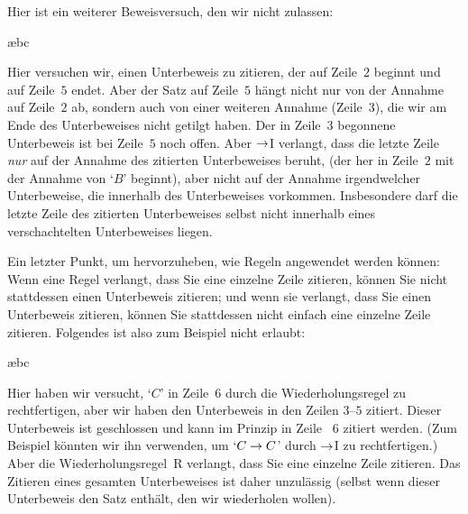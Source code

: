 Hier ist ein weiterer Beweisversuch, den wir nicht zulassen:
\begin{fitchproof}
\open
	\open
	\ae{bc}
	\close
\close
{}
 
\end{fitchproof}
Hier versuchen wir, einen Unterbeweis zu zitieren, der auf Zeile~$2$ beginnt und auf Zeile~$5$ endet. Aber der Satz auf Zeile~$5$ hängt nicht nur von der Annahme auf Zeile~$2$ ab, sondern auch von einer weiteren Annahme (Zeile~$3$), die wir am Ende des Unterbeweises nicht getilgt haben. Der in Zeile~$3$ begonnene Unterbeweis ist bei Zeile~$5$ noch offen. Aber $\rightarrow$I verlangt, dass die letzte Zeile \emph{nur} auf der Annahme des zitierten Unterbeweises beruht, (der her in Zeile~$2$ mit der Annahme von `$B$' beginnt), aber nicht auf der Annahme irgendwelcher Unterbeweise, die innerhalb des Unterbeweises vorkommen. Insbesondere darf die letzte Zeile des zitierten Unterbeweises selbst nicht innerhalb eines verschachtelten Unterbeweises liegen.


Ein letzter Punkt, um hervorzuheben, wie Regeln angewendet werden können: Wenn eine Regel verlangt, dass Sie eine einzelne Zeile zitieren, können Sie nicht stattdessen einen Unterbeweis zitieren; und wenn sie verlangt, dass Sie einen Unterbeweis zitieren, können Sie stattdessen nicht einfach eine einzelne Zeile zitieren. Folgendes ist also zum Beispiel nicht erlaubt:
\begin{fitchproof}
\open
	\open
	\ae{bc}
	\close
 
\close
{}
\end{fitchproof}
Hier haben wir versucht, `$C$' in Zeile~$6$ durch die Wiederholungsregel zu rechtfertigen, aber wir haben den Unterbeweis in den Zeilen $3$--$5$ zitiert. Dieser Unterbeweis ist geschlossen und kann im Prinzip in Zeile ~$6$ zitiert werden. (Zum Beispiel könnten wir ihn verwenden, um `$C \rightarrow C$' durch $\rightarrow$I zu rechtfertigen.) Aber die Wiederholungsregel~R verlangt, dass Sie eine einzelne Zeile zitieren. Das Zitieren eines gesamten Unterbeweises ist daher unzulässig (selbst wenn dieser Unterbeweis den Satz enthält, den wir wiederholen wollen).

